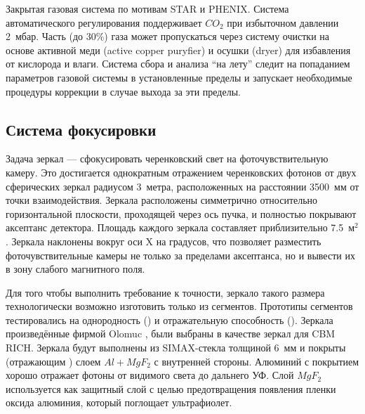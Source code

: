 Закрытая газовая система по мотивам STAR и PHENIX.
Система автоматического регулирования поддерживает $CO_{2}$ при избыточном давлении 2~мбар.
Часть (до 30\%) газа может пропускаться через систему очистки на основе активной меди (active copper puryfier) и осушки (dryer) для избавления от кислорода и влаги.
Система сбора и анализа ``на лету'' следит на попаданием параметров газовой системы в установленные пределы и  запускает необходимые процедуры коррекции в случае выхода за эти пределы.

%                                   

\subsection{Система фокусировки}

Задача зеркал --- сфокусировать черенковский свет на фоточувствительную камеру. Это достигается однократным отражением черенковских фотонов от двух сферических зеркал радиусом 3~метра, расположенных на расстоянии 3500~мм от точки взаимодействия.
Зеркала расположены симметрично относительно горизонтальной плоскости, проходящей через ось пучка, и полностью покрывают аксептанс детектора. Площадь каждого зеркала составляет приблизительно 7.5~м$^2$. Зеркала наклонены вокруг оси X на \todo градусов, что позволяет разместить фоточувствительные камеры не только за пределами аксептанса, но и вывести их в зону слабого магнитного поля.

Для того чтобы выполнить требование к точности, зеркало такого размера технологически возможно изготовить только из сегментов. Прототипы сегментов тестировались на однородность (\cite{}) и отражательную способность (\cite{}). Зеркала произведённые фирмой Olomuc \todo, были выбраны в качестве зеркал для CBM RICH. Зеркала будут выполнены из SIMAX-стекла толщиной 6~мм и покрыты (отражающим \todo) слоем $Al+MgF_{2}$ с внутренней стороны. Алюминий с покрытием хорошо отражает фотоны от видимого света до дальнего УФ. Слой $MgF_{2}$ используется как защитный слой с целью предотвращения появления пленки оксида алюминия, который поглощает ультрафиолет.

